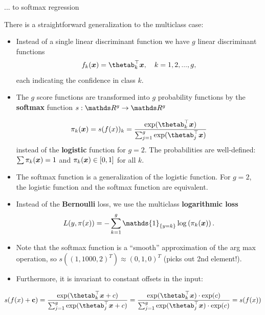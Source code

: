 \begin{vbframe}{... to softmax regression} 

There is a straightforward generalization to the multiclass case: 

\begin{itemize}
  \item Instead of a single linear discriminant function we have $g$ linear discriminant functions
    $$
      f_k(\xv) = \thetab_k^\top \xv, \quad k = 1, 2, ..., g,
    $$
  each indicating the confidence in class $k$.
  \item The $g$ score functions are transformed into $g$ probability functions by the \textbf{softmax} function $s:\R^g \to \R^g$ 

  $$
    \pi_k(\xv) = s(\fx)_k = \frac{\exp(\thetab_k^\top \xv)}{\sum_{j = 1}^g \exp(\thetab_j^\top \xv) }
  $$
  instead of the \textbf{logistic} function for $g = 2$. The probabilities are well-defined: $\sum \pi_k(\bm{x}) = 1$ and $\pi_k(\bm{x}) \in [0, 1]$ for all $k$. 

  \item The softmax function is a generalization of the logistic function. For $g = 2$, the logistic function and the softmax function are equivalent. 

  \item Instead of the \textbf{Bernoulli} loss, we use the multiclass \textbf{logarithmic loss}
   $$
    L(y, \pix) = - \sum_{k = 1}^g \mathds{1}_{\{y = k\}} \log\left(\pi_k(\xv)\right).
  $$ 
    \item Note that the softmax function is a \enquote{smooth} approximation of the arg max operation,
        so $s((1, 1000, 2)^T) \approx (0, 1, 0)^T$ (picks out 2nd element!).  
    \item Furthermore, it is invariant to constant offsets in the input:  
      \end{itemize}
    $$ 
    s(\fx + \mathbf{c}) = \frac{\exp(\thetab_k^\top \xv + c)}{\sum_{j = 1}^g \exp(\thetab_j^\top \xv + c)} = 
    \frac{\exp(\thetab_k^\top \xv)\cdot \exp(c)}{\sum_{j = 1}^g \exp(\thetab_j^\top \xv) \cdot \exp(c)} = 
    s(\fx)
    $$  


\end{vbframe}


